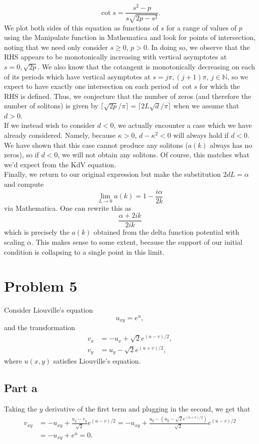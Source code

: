 \documentclass{article}
\begin{document}
\[
\cot s=\frac{s^2-p}{s\sqrt{2p-s^2}}.
\] 
We plot both sides of this equation as functions of $s$ for a range of values of $p$ using the Manipulate function in Mathematica and look for points of intersection, noting that we need only consider $s\geq0$, $p>0$. In doing so, we observe that the RHS appears to be monotonically increasing with vertical asymptotes at $s=0,\sqrt{2p}$. We also know that the cotangent is monotonically decreasing on each of its periods which have vertical asymptotes at $s=j\pi,(j+1)\pi$, $j\in\mathbb{N}$, so we expect to have exactly one intersection on each period of $\cot s$ for which the RHS is defined. Thus, we conjecture that the number of zeros (and therefore the number of solitons) is given by $\lceil\sqrt{2p}/\pi\rceil=\lceil2L\sqrt{d}/\pi\rceil$ when we assume that $d>0$.\\
If we instead wish to consider $d<0$, we actually encounter a case which we have already considered. Namely, because $\kappa>0$, $d-\kappa^2<0$ will always hold if $d<0$. We have shown that this case cannot produce any solitons ($a(k)$ always has no zeros), so if $d<0$, we will not obtain any solitons. Of course, this matches what we'd expect from the KdV equation.\\
Finally, we return to our original expression but make the substitution $2dL=\alpha$ and compute
\[
\lim_{L\to0}a(k)=1-\frac{i\alpha}{2k}
\]
via Mathematica. One can rewrite this as 
\[
\frac{\alpha+2ik}{2ik}
\]
which is precisely the $a(k)$ obtained from the delta function potential with scaling $\alpha$. This makes sense to some extent, because the support of our initial condition is collapsing to a single point in this limit. 


\section{Problem 5}
Consider Liouville's equation
\[
u_{xy}=e^u,
\]
and the transformation
\begin{align*}
	v_x&=-u_x+\sqrt{2}e^{(u-v)/2},\\
	v_y&=u_y-\sqrt{2}e^{(u+v)/2},
\end{align*}
where $u(x,y)$ satisfies Liouville's equation. 
\subsection{Part a}
Taking the $y$ derivative of the first term and plugging in the second, we get that
\begin{align*}
v_{xy}&=-u_{xy}+\frac{u_y-v_y}{\sqrt{2}}e^{(u-v)/2}=-u_{xy}+\frac{u_y-(u_y-\sqrt{2}e^{(u+v)/2})}{\sqrt{2}}e^{(u-v)/2}\\&=-u_{xy}+e^u=0.
\end{align*}
\end{document}
